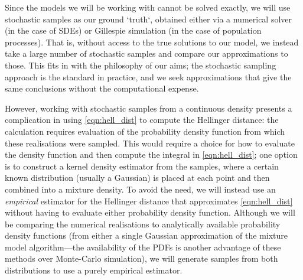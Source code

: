Since the models we will be working with cannot be solved exactly, we will use stochastic samples as our ground `truth`, obtained either via a numerical solver (in the case of SDEs) or Gillespie simulation (in the case of population processes).
That is, without access to the true solutions to our model, we instead take a large number of stochastic samples and compare our approximations to those.
This fits in with the philosophy of our aims; the stochastic sampling approach is the standard in practice, and we seek approximations that give the same conclusions without the computational expense.

However, working with stochastic samples from a continuous density presents a complication in using \cref{eqn:hell_dist} to compute the Hellinger distance: the calculation requires evaluation of the probability density function from which these realisations were sampled.
This would require a choice for how to evaluate the density function and then compute the integral in \cref{eqn:hell_dist}; one option is to construct a kernel density estimator from the samples, where a certain known distribution (usually a Gaussian) is placed at each point and then combined into a mixture density.
To avoid the need, we will instead use an \emph{empirical} estimator for the Hellinger distance that approximates \cref{eqn:hell_dist} without having to evaluate either probability density function.
Although we will be comparing the numerical realisations to analytically available probability density functions (from either a single Gaussian approximation of the mixture model algorithm---the availability of the PDFs is another advantage of these methods over Monte-Carlo simulation), we will generate samples from both distributions to use a purely empirical estimator.

